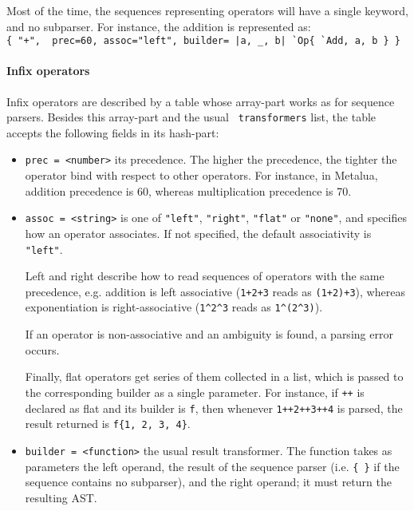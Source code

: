 Most of the time, the sequences representing operators will have a
single keyword, and no subparser. For instance, the addition is
represented as:\\
\verb~{ "+",  prec=60, assoc="left", builder= |a, _, b| `Op{ `Add, a, b } }~


\paragraph{Infix operators}
Infix operators are described by a table whose array-part works as for
sequence parsers. Besides this array-part and the usual {\tt
  transformers} list, the table accepts the following fields in its hash-part:
\begin{itemize}

\item\verb|prec = <number>| its precedence. The higher the precedence, 
  the tighter the operator bind with respect to other operators. For
  instance, in Metalua, addition precedence is 60, whereas
  multiplication precedence is 70.

\item\verb|assoc = <string>| is one of \verb|"left"|, \verb|"right"|,
  \verb|"flat"| or \verb|"none"|, and specifies how an operator
  associates. If not specified, the default associativity is
  \verb|"left"|. 

  Left and right describe how to read sequences of operators with the
  same precedence, e.g. addition is left associative ({\tt 1+2+3} reads as
  {\tt(1+2)+3}), whereas exponentiation is right-associative (\verb|1^2^3|
  reads as \verb|1^(2^3)|).

  If an operator is non-associative and an ambiguity is found, a
  parsing error occurs. 

  Finally, flat operators get series of them collected in a list,
  which is passed to the corresponding builder as a single
  parameter. For instance, if \verb|++| is declared as flat and its
  builder is \verb|f|, then whenever {\tt 1++2++3++4} is parsed, the
  result returned is {\tt f\{1, 2, 3, 4\}}.

\item\verb|builder = <function>| the usual result transformer. The
  function takes as parameters the left operand, the result of the
  sequence parser (i.e. \verb|{ }| if the sequence contains no
  subparser), and the right operand; it must return the resulting AST.

\end{itemize}

